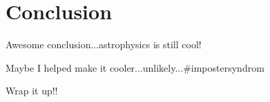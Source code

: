 
\chapter{Conclusion}


Awesome conclusion...astrophysics is still cool!

Maybe I helped make it cooler...unlikely...$\#$impostersyndrom

Wrap it up!!
